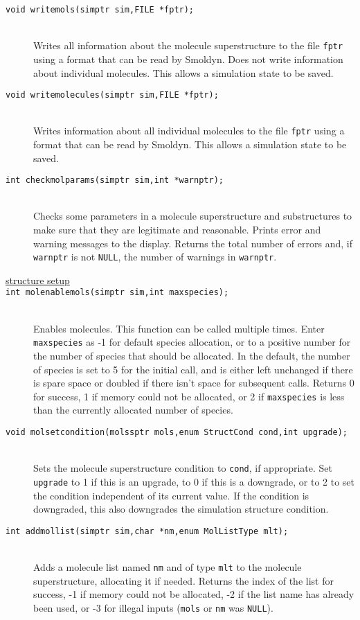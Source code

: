 \documentclass {book}
\newcommand {\ttt} {\texttt}
\begin{document}
\begin{description}
\item[\ttt{void writemols(simptr sim,FILE *fptr);}]
\hfill \\
Writes all information about the molecule superstructure to the file \ttt{fptr} using a format that can be read by Smoldyn. Does not write information about individual molecules. This allows a simulation state to be saved.

\item[\ttt{void writemolecules(simptr sim,FILE *fptr);}]
\hfill \\
Writes information about all individual molecules to the file \ttt{fptr} using a format that can be read by Smoldyn. This allows a simulation state to be saved.

\item[\ttt{int checkmolparams(simptr sim,int *warnptr);}]
\hfill \\
Checks some parameters in a molecule superstructure and substructures to make sure that they are legitimate and reasonable. Prints error and warning messages to the display. Returns the total number of errors and, if \ttt{warnptr} is not \ttt{NULL}, the number of warnings in \ttt{warnptr}.

\item[\underline{structure setup}]

\item[\ttt{int molenablemols(simptr sim,int maxspecies);}]
\hfill \\
Enables molecules. This function can be called multiple times. Enter \ttt{maxspecies} as -1 for default species allocation, or to a positive number for the number of species that should be allocated. In the default, the number of species is set to 5 for the initial call, and is either left unchanged if there is spare space or doubled if there isn't space for subsequent calls. Returns 0 for success, 1 if memory could not be allocated, or 2 if \ttt{maxspecies} is less than the currently allocated number of species.

\item[\ttt{void molsetcondition(molssptr mols,enum StructCond cond,int upgrade);}]
\hfill \\
Sets the molecule superstructure condition to \ttt{cond}, if appropriate. Set \ttt{upgrade} to 1 if this is an upgrade, to 0 if this is a downgrade, or to 2 to set the condition independent of its current value. If the condition is downgraded, this also downgrades the simulation structure condition.

\item[\ttt{int addmollist(simptr sim,char *nm,enum MolListType mlt);}]
\hfill \\
Adds a molecule list named \ttt{nm} and of type \ttt{mlt} to the molecule superstructure, allocating it if needed. Returns the index of the list for success, -1 if memory could not be allocated, -2 if the list name has already been used, or -3 for illegal inputs (\ttt{mols} or \ttt{nm} was \ttt{NULL}).


\end{description}
\end{document}
